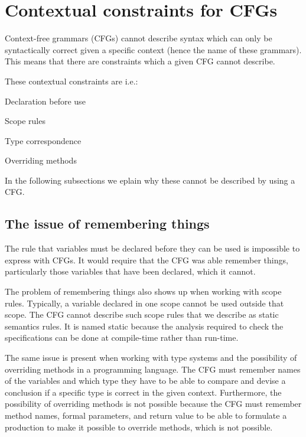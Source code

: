 \section{Contextual constraints for CFGs}
\label{sec:contextualconstraints}

Context-free grammars (CFGs) cannot describe syntax which can only be syntactically
correct given a specific context (hence the name of these grammars). This means
that there are constraints which a given CFG cannot describe.

These contextual constraints are i.e.\cite[p. 39]{plpp}:

\begin{dlist}
\item Declaration before use
\item Scope rules
\item Type correspondence
\item Overriding methods
\end{dlist}

In the following subsections we eplain why these cannot be described by using a
CFG.


\subsection{The issue of remembering things}

The rule that variables must be declared before they can be used is impossible to
express with CFGs. It would require that the CFG was able remember things, particularly
those variables that have been declared, which it cannot. 

The problem of remembering things also shows up when working with scope rules. 
Typically, a variable declared in one scope cannot be used outside
that scope. The CFG cannot describe such scope rules that we describe as static
semantics rules. It is named static because the analysis required to check the
specifications can be done at compile-time rather than run-time.
\cite[p. 153]{sebesta2013}

The same issue is present when working with type systems and the possibility of
overriding methods in a programming language. The CFG must remember names of the
variables and which type they have to be able to compare and devise a conclusion
if a specific type is correct in the given context. Furthermore, the possibility
of overriding methods is not possible because the CFG must remember method
names, formal parameters, and return value to be able to formulate a
production to make it possible to override methods, which is not possible. 

